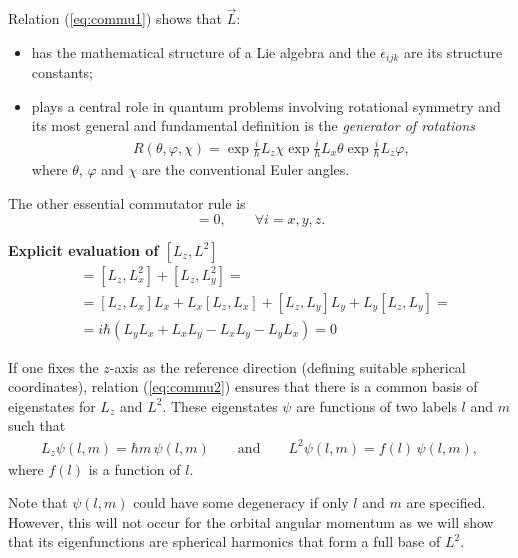Relation (\ref{eq:commu1}) shows that $\vec{L}$:
\begin{itemize}
    \item has the mathematical structure of a Lie algebra and the $\epsilon_{ijk}$ are its structure constants;
    \item plays a central role in quantum problems involving rotational symmetry and its most general and fundamental definition is the \textit{generator of rotations}
    \begin{align*}
        R(\theta,\varphi,\chi) = \exp{\frac{i}{\hbar}L_z \chi} \exp{\frac{i}{\hbar}L_x \theta} \exp{\frac{i}{\hbar}L_z \varphi},
    \end{align*}
    where $\theta$, $\varphi$ and $\chi$ are the conventional Euler angles. 
\end{itemize}

The other essential commutator rule is
\begin{equation}
    [L_i,L^2] = 0, \qquad \forall i = x,y,z.
    \label{eq:commu2}
\end{equation}

\begin{tcolorbox}
\textbf{Explicit evaluation of $[L_z,L^2]$} 
    \begin{align*}
        [L_z,L^2] &= [L_z,L_x^2] + [L_z,L_y^2] = \\
        &= [L_z,L_x]L_x + L_x[L_z,L_x] + [L_z,L_y]L_y + L_y[L_z,L_y] = \\
        &= i\hbar (L_y L_x + L_x L_y - L_xL_y - L_y L_x) = 0
    \end{align*}
\end{tcolorbox}

If one fixes the $z$-axis as the reference direction (defining suitable spherical coordinates), relation (\ref{eq:commu2}) ensures that there is a common basis of eigenstates for $L_z$ and $L^2$. These eigenstates $\psi$ are functions of two labels $l$ and $m$ such that
\begin{align}
    L_z \psi(l,m) = \hbar m \, \psi(l,m) \qquad \text{and} \qquad L^2 \psi(l,m) = f(l) \, \psi(l,m),
    \label{eq:eigenvaleq}
\end{align}
where $f(l)$ is a function of $l$.

Note that $\psi(l,m)$ could have some degeneracy if only $l$ and $m$ are specified. However, this will not occur for the orbital angular momentum as we will show that its eigenfunctions are spherical harmonics that form a full base of $L^2$.

